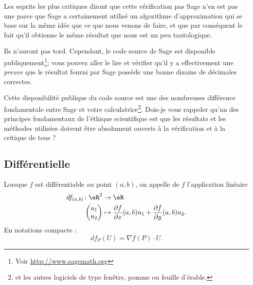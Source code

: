 \begin{remark}
    Les esprits les plus critiques diront que cette vérification pas Sage n'en est pas une parce que Sage a certainement utilisé un algorithme d'approximation qui se base sur la même idée que ce que nous venons de faire, et que par conséquent le fait qu'il obtienne le même résultat que nous est un peu tautologique. 
    
    Ils n'auront pas tord. Cependant, le code source de Sage est disponible publiquement\footnote{Voir \url{http://www.sagemath.org}}; vous pouvez aller le lire et vérifier qu'il y a effectivement une \emph{preuve} que le résultat fourni par Sage possède une bonne dizaine de décimales correctes. 
    
    Cette disponibilité publique du code source est une des nombreuses différence fondamentale entre Sage et votre calculatrice\footnote{et les autres logiciels de type fenêtre, pomme ou feuille d'érable.}. Dois-je vous rappeler qu'un des principes fondamentaux de l'éthique scientifique est que les résultats et les méthodes utilisées doivent être absolument ouverts à la vérification et à la critique de tous ?
\end{remark}

\subsection{Différentielle}

\begin{definition}      \label{DefDiffrdrrOM}
    Lorsque $f$ est différentiable au point $(a,b)$, on appelle  de $f$ l'application linéaire
    \begin{equation}        \label{EqDefDiffmapdfOM}
        \begin{aligned}
            df_{(a,b)}\colon \eR^2&\to \eR \\
            \begin{pmatrix}
                u_1    \\ 
                u_2    
            \end{pmatrix}&\mapsto \frac{ \partial f }{ \partial x }(a,b)u_1+\frac{ \partial f }{ \partial y }(a,b)u_2. 
        \end{aligned}
    \end{equation}
    En notations compacte :
    \begin{equation}        \label{EqdfUPnableOM}
        df_{P}(U)=\nabla f(P)\cdot U.
    \end{equation}
\end{definition}

